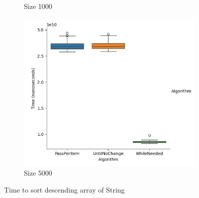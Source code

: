 \documentclass{article}
\begin{document}
\begin{figure}[ht]
\begin{subfigure}{0.3\textwidth}
    \caption{Size 1000}
    \label{fig:img2}
  \end{subfigure}
  \begin{subfigure}{0.3\textwidth}
    \centering
    \includegraphics[width=\linewidth]{../figureStringDesc5000.png}
    \caption{Size 5000}
    \label{fig:img3}
  \end{subfigure}
  \caption{Time to sort descending array of String}
  \label{fig:three_images}
\end{figure}
\end{document}
